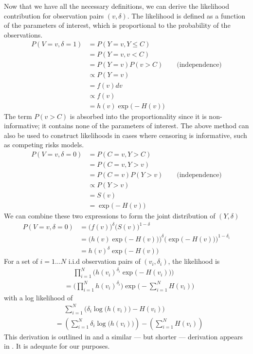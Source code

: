 \documentclass[12pt]{article}
\begin{document}
Now that we have all the necessary definitions, we can derive the likelihood contribution for observation pairs $(v,\delta)$.
The likelihood is defined as a function of the parameters of interest, which is proportional to the probability of the observations.
\begin{align*}
P(V=v, \delta = 1)
&= P(Y=v, Y \leq C) \\
&= P(Y=v, v<C) \\
&= P(Y=v)P(v>C) \qquad \text{(independence)} \\
&\propto P(Y=v) \\
&= f(v)dv \\
&\propto f(v)  \\
&= h(v) \exp\big( -H(v) \big)
\end{align*}
The term $P(v>C)$ is absorbed into the proportionality since it is non-informative; it contains none of the parameters of interest.
The above method can also be used to construct likelihoods in cases where censoring is informative, such as competing risks models.
\begin{align*}
P(V=v, \delta = 0)
&= P(C=v, Y > C) \\
&= P(C=v, Y > v) \\
&= P(C=v)P(Y > v) \qquad \text{(independence)} \\
&\propto P(Y > v)  \\
&=  S(v) \\
&= \exp\big( -H(v) \big)
\end{align*}
We can combine these two expressions to form the joint distribution of $(Y, \delta)$
\begin{align*}
P(V=v, \delta = 0)
&=
\big(f(v)\big)^{\delta}\big( S(v) \big)^{1-\delta} \\
&=
\bigg(h(v) \exp\big( -H(v) \big) \bigg)^{\delta}
\bigg(\exp\big( -H(v) \big) \bigg)^{1-\delta_i}  \\
&=
h(v)^{\delta} \exp\big( -H(v) \big)
\end{align*}
For a set of $i = 1 \ldots N$ i.i.d observation pairs of
$(v_i,\delta_i)$, the likelihood  is
\begin{align*}
&\phantom{=}
\prod_{i=1}^{N}{\bigg(
            h(v_i)^{\delta_i} \exp\big( -H(v_i) \big)
           \bigg)} \\
&=
      \bigg(
      \prod_{i=1}^{N}{ h(v_i)^{\delta_i} }
      \bigg)
           \exp\bigg( -
\sum_{i=1}^{N}{
           H(v_i)
              }
           \bigg)
\end{align*}
with a log likelihood of
\begin{align}
&\phantom{=}
 \sum_{i=1}^{N}{
               \bigg(
                 {\delta_i}
                 \log\big( h(v_i) \big)
                 -H(v_i)
               \bigg)
               }
\nonumber \\
&=
 \left(
     \sum_{i=1}^{N}{ {\delta_i} \log\big( h(v_i) \big) }
 \right)
 -
 \left(
     \sum_{i=1}^{N}{ H(v_i)   }
 \right)
 \label{eq:NHPP:loglik}
\end{align}
This derivation is outlined in \citet{tableman2003survival} and a similar --- but shorter --- derivation appears in \citet[ch.~3.5]{klein2003survival}.
It is adequate for our purposes.
\end{document}
